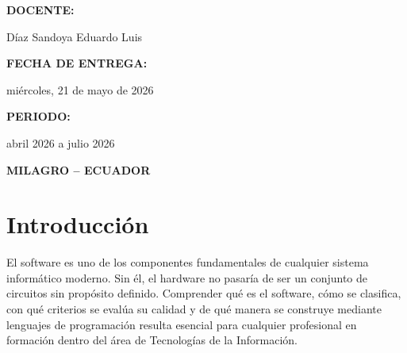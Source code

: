 \documentclass[12pt,a4paper]{article}
\begin{document}
\begin{center}
		\vspace{1cm}
		
		{\fontsize{13}{15}\selectfont\bfseries DOCENTE:\par}
		\vspace{0.2cm}
		{\fontsize{13}{15}\selectfont Díaz Sandoya Eduardo Luis\par}
		
		\vspace{1cm}
		
		{\fontsize{13}{15}\selectfont\bfseries FECHA DE ENTREGA:\par}
		\vspace{0.2cm}
		{\fontsize{13}{15}\selectfont miércoles, 21 de mayo de 2026\par}
		
		\vspace{1cm}
		
		{\fontsize{13}{15}\selectfont\bfseries PERIODO:\par}
		\vspace{0.2cm}
		{\fontsize{13}{15}\selectfont abril 2026 a julio 2026\par}
		
		\vfill
		
		{\fontsize{18}{15}\selectfont\bfseries MILAGRO -- ECUADOR\par}
		
		\vspace*{0.5cm}
		
	\end{center}
	
	\clearpage
	\thispagestyle{fancy}
	\tableofcontents
	\clearpage
	
	
	\section{Introducción}
	
	El software es uno de los componentes fundamentales de cualquier sistema informático moderno. Sin él, el hardware no pasaría de ser un conjunto de circuitos sin propósito definido. Comprender qué es el software, cómo se clasifica, con qué criterios se evalúa su calidad y de qué manera se construye mediante lenguajes de programación resulta esencial para cualquier profesional en formación dentro del área de Tecnologías de la Información.
	
\end{document}
